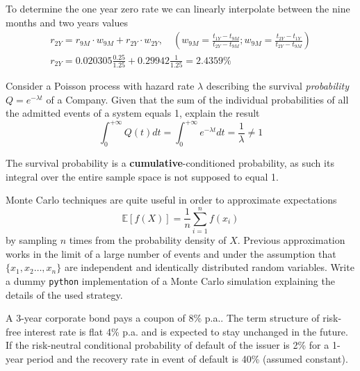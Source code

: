 \documentclass[12pt,a4paper]{exam}
\begin{document}
\begin{questions}
\begin{solution}
To determine the one year zero rate we can linearly interpolate between the nine months and two years values
\begin{equation*}
  \begin{gathered}
    r_{2Y} = r_{9M}\cdot w_{9M} + r_{2Y}\cdot w_{2Y},\quad\left(w_{9M}=\frac{t_{1Y}-t_{9M}}{t_{2Y}-t_{9M}};w_{9M}=\frac{t_{2Y}-t_{1Y}}{t_{2Y}-t_{9M}}\right) \\
    r_{2Y} = 0.020305\frac{0.25}{1.25} + 0.29942 \frac{1}{1.25} = 2.4359\%
  \end{gathered}
\end{equation*}
\end{solution}
\question
Consider a Poisson process with hazard rate $\lambda$ describing the survival \emph{probability} $Q=e^{-\lambda t}$ of a Company. Given that the sum of the individual probabilities of all the admitted events of a system equals 1, explain the result
\begin{equation*}
\int_0^{+\infty} Q(t) dt = \int_0^{+\infty} e^{-\lambda t} dt = \frac{1}{\lambda} \neq 1 
\end{equation*}
\fillwithlines{3cm}
\begin{solution}
The survival probability is a \textbf{cumulative}-conditioned probability, as such its integral over the entire sample space is not supposed to equal 1. 
\end{solution}

\question
Monte Carlo techniques are quite useful in order to approximate expectations
\begin{equation*}
\mathbb{E}[f(X)] = \frac{1}{n}\sum_{i=1}^n f(x_i)
\end{equation*} 
by sampling $n$ times from the probability density of $X$.
Previous approximation works in the limit of a large number of events and under the assumption that $\{x_1, x_2\ldots,x_n\}$ are independent and identically distributed random variables.
Write a dummy \texttt{python} implementation of a Monte Carlo simulation explaining the details of the used strategy.
\makeemptybox{3cm}
\begin{solution}
\end{solution}

\question
A 3-year corporate bond pays a coupon of 8\% p.a.. The term structure of risk-free interest rate is flat 4\% p.a. and is expected to stay unchanged in the future. If the risk-neutral conditional probability of default of the issuer is 2\% for a 1-year period and the recovery rate in event of default is 40\% (assumed constant).


\end{questions}
\end{document}

